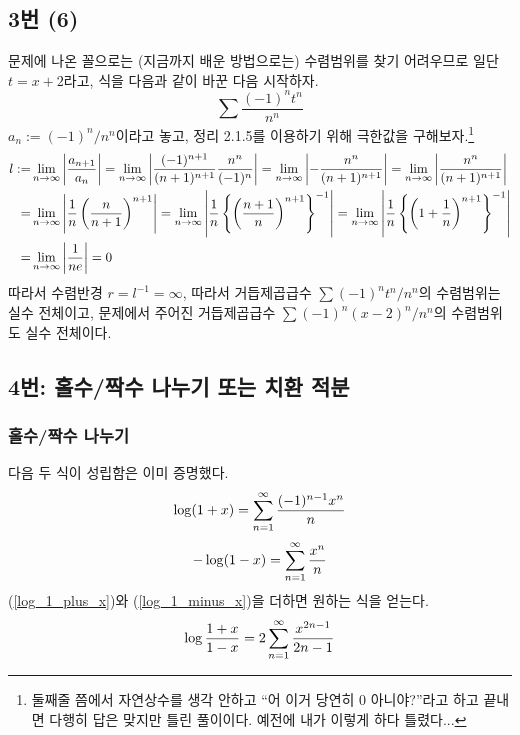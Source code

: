 \subsection{3번 (6)}
문제에 나온 꼴으로는 (지금까지 배운 방법으로는) 수렴범위를 찾기 어려우므로 일단 $t=x+2$라고, 식을 다음과 같이 바꾼 다음 시작하자.
\[
\sum \frac{(-1)^nt^n}{n^n}
\]
$a_n:=(-1)^n/n^n$이라고 놓고, 정리 2.1.5를 이용하기 위해 극한값을 구해보자.\footnote{둘째줄 쯤에서 자연상수를 생각 안하고 ``어 이거 당연히 0 아니야?''라고 하고 끝내면 다행히 답은 맞지만 틀린 풀이이다. 예전에 내가 이렇게 하다 틀렸다...}
\begin{align*}
l:=&\lim_{n\to\infty}\left|\frac{a_{n+1}}{a_n}\right|=\lim_{n\to\infty}\left|\frac{(-1)^{n+1}}{(n+1)^{n+1}}\frac{n^n}{(-1)^n}\right|=\lim_{n\to\infty}\left|-\frac{n^n}{(n+1)^{n+1}}\right|=\lim_{n\to\infty}\left|\frac{n^n}{(n+1)^{n+1}}\right|\\
=&\lim_{n\to\infty}\left|\frac{1}{n}\left(\frac{n}{n+1}\right)^{n+1}\right|=\lim_{n\to\infty}\left|\frac{1}{n}\left\{\left(\frac{n+1}{n}\right)^{n+1}\right\}^{-1}\right|=\lim_{n\to\infty}\left|\frac{1}{n}\left\{\left(1+\frac{1}{n}\right)^{n+1}\right\}^{-1}\right|\\
=&\lim_{n\to\infty}\left|\frac{1}{ne}\right|=0
\end{align*}
따라서 수렴반경 $r=l^{-1}=\infty$, 따라서 거듭제곱급수 $\sum (-1)^nt^n/n^n$의 수렴범위는 실수 전체이고, 문제에서 주어진 거듭제곱급수 $\sum (-1)^n(x-2)^n/n^n$의 수렴범위도 실수 전체이다.

\subsection{4번: 홀수/짝수 나누기 또는 치환 적분}
\subsubsection{홀수/짝수 나누기}
다음 두 식이 성립함은 이미 증명했다.
\begin{align}\label{log_1_plus_x}
\log(1+x)=\sum^\infty_{n=1}\frac{(-1)^{n-1}x^n}{n}
\end{align}
\begin{align}\label{log_1_minus_x}
-\log(1-x)=\sum^\infty_{n=1}\frac{x^n}{n}
\end{align}
(\ref{log_1_plus_x})와 (\ref{log_1_minus_x})을 더하면 원하는 식을 얻는다.
\[
\log\frac{1+x}{1-x}=2\sum^\infty_{n=1}\frac{x^{2n-1}}{2n-1}
\]

